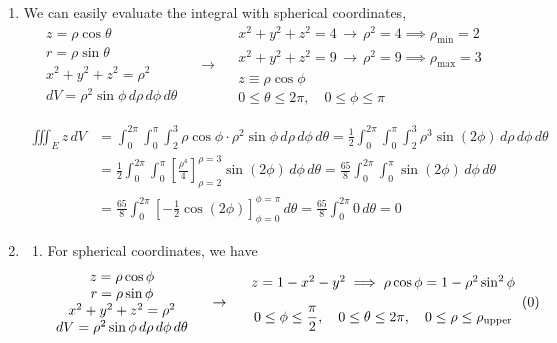 \documentclass[a4paper, 12pt]{article}
\begin{document}
\begin{enumerate}[leftmargin=*,label=\textbf{\arabic*.}]
\item We can easily evaluate the integral with spherical coordinates,
\[
\begin{array}{c}
z=\rho\cos\theta\\
r=\rho\sin\theta\\
x^2+y^2+z^2=\rho^2\\
dV=\rho^2\sin\phi\,d\rho\,d\phi\,d\theta
\end{array}\quad\rightarrow\quad
\begin{array}{c}
x^2+y^2+z^2=4\,\rightarrow\,\rho^2 = 4\implies \rho_{\text{min}}=2\\
x^2+y^2+z^2=9\,\rightarrow\,\rho^2 = 9\implies \rho_{\text{max}}=3\\
z\equiv\rho\cos\phi\\
0\leq\theta\leq2\pi,\quad0\leq\phi\leq\pi
\end{array}
\]

\begin{align*}
\iiint_Ez\,dV&=\int_0^{2\pi}\int_0^\pi\int_2^3\rho\cos\phi\cdot\rho^2\sin\phi\,d\rho\,d\phi\,d\theta=\frac12\int_0^{2\pi}\int_0^\pi\int_2^3\rho^3\sin(2\phi)\,d\rho\,d\phi\,d\theta\\[1em]&=\frac12\int_0^{2\pi}\int_0^\pi\left[\frac{\rho^4}{4}\right]_{\rho=2}^{\rho=3}\sin(2\phi)\,d\phi\,d\theta=\frac{65}{8}\int_0^{2\pi}\int_0^\pi\sin(2\phi)\,d\phi\,d\theta\\[1em]&=\frac{65}{8}\int_0^{2\pi}\left[-\frac12\cos(2\phi)\right]_{\phi=0}^{\phi=\pi}\,d\theta=\frac{65}{8}\int_0^{2\pi}0\,d\theta =\boxed0
\end{align*}

\newpage

\item \begin{enumerate}[leftmargin=*,label=\textbf{\alph*.}]
\item For spherical coordinates, we have
\label{eq:20_21_spring_final_1}
\[
\begin{array}{c}
z=\rho\cos\phi\\
r=\rho\sin\phi\\
x^2+y^2+z^2=\rho^2\\
dV=\rho^2\sin\phi\,d\rho\,d\phi\,d\theta
\end{array}
\quad\rightarrow\quad
\begin{array}{cc}
z=1-x^2-y^2
\implies
\rho\cos\phi=1-\rho^2\sin^2\phi
\\[1em]
\displaystyle
0\leq\phi\leq\frac{\pi}{2},
\quad
0\leq\theta\leq2\pi,
\quad
0\leq\rho\leq\rho_{\text{upper}}
\end{array}
\hfill
\vcenter{\hbox{(\theequation)}}
\]


\end{enumerate}
\end{enumerate}
\end{document}
